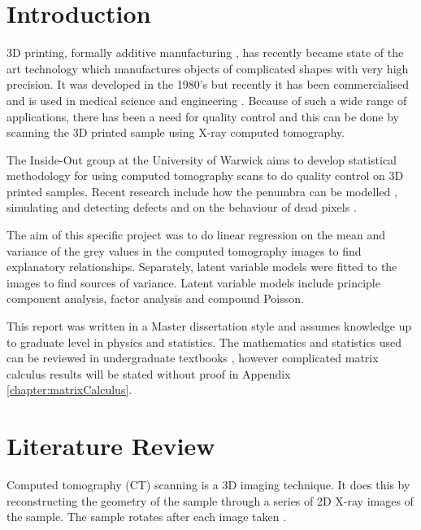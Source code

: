 \documentclass[12pt]{report}
\begin{document}
\tableofcontents

\chapter{Introduction}

3D printing, formally additive manufacturing \cite{wong2012review}, has recently became state of the art technology which manufactures objects of complicated shapes with very high precision. It was developed in the 1980's \cite{kodama1981automatic} but recently it has been commercialised and is used in medical science \cite{kang20163d} and engineering \cite{wong2012review}. Because of such a wide range of applications, there has been a need for quality control and this can be done by scanning the 3D printed sample using X-ray computed tomography.

The Inside-Out group at the University of Warwick aims to develop statistical methodology for using computed tomography scans to do quality control on 3D printed samples. Recent research include how the penumbra can be modelled \cite{kueh2014modelling}, simulating and detecting defects and on the behaviour of dead pixels \cite{brettschneider2014spatial}.

The aim of this specific project was to do linear regression on the mean and variance of the grey values in the computed tomography images to find explanatory relationships. Separately, latent variable models were fitted to the images to find sources of variance. Latent variable models include principle component analysis, factor analysis and compound Poisson.

This report was written in a Master dissertation style and assumes knowledge up to graduate level in physics and statistics. The mathematics and statistics used can be reviewed in undergraduate textbooks \cite{riley2006mathematical} \cite{rice2009mathematical}, however complicated matrix calculus results will be stated without proof in Appendix \ref{chapter:matrixCalculus}.

\chapter{Literature Review}
Computed tomography (CT) scanning is a 3D imaging technique. It does this by reconstructing the geometry of the sample through a series of 2D X-ray images of the sample. The sample rotates after each image taken \cite{cantatore2011introduction}.
\end{document}
